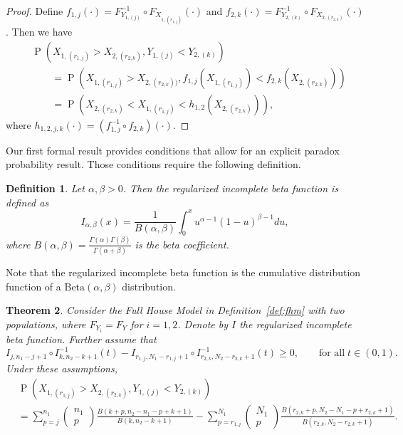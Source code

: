 \documentclass[12pt]{article}
\DeclareMathOperator*{\Prob}{P}
\newtheorem{theorem}{Theorem}[section]
\newtheorem{defn}[theorem]{Definition}
\begin{document}
\begin{proof}
Define $f_{1,j}(\cdot) = F_{Y_{1, (j)}}^{-1} \circ F_{X_{1,(r_{1,j})}} (\cdot)$ and 
$f_{2,k}(\cdot) = F_{Y_{2, (k)}}^{-1} \circ F_{X_{2,(r_{2,k})}} (\cdot)$. Then we have 
\begin{align*}
  &\Prob\left(X_{1,(r_{1,j})} > X_{2,(r_{2,k})}, Y_{1,(j)} < Y_{2,(k)}\right) \\
  &\qquad= \Prob\left(X_{1,(r_{1,j})} > X_{2,(r_{2,k}))}, f_{1,j}(X_{1,(r_{1,j})}) < f_{2,k}(X_{2,(r_{2,k})})\right) \\
  &\qquad= \Prob\left( X_{2,(r_{2,k})} < X_{1,(r_{1,j})}  < h_{1,2}\left(X_{2,(r_{2,k})}\right)\right),
\end{align*}
where $h_{1,2,j,k}(\cdot) = (f_{1,j}^{-1} \circ f_{2,k})(\cdot)$. %
\end{proof}

Our first formal result provides conditions that allow for an explicit paradox probability result. Those conditions require the following definition.

\begin{defn}
\label{def:ribf}
Let $\alpha,\beta > 0$. Then the regularized incomplete beta function is defined as
$$
  I_{\alpha,\beta}(x) = \frac{1}{B(\alpha,\beta)} \int_0^x u^{\alpha-1}(1-u)^{\beta-1}du,
$$
where $B(\alpha,\beta) = \frac{\Gamma(\alpha)\Gamma(\beta)}{\Gamma(\alpha + \beta)}$ is the beta coefficient.
\end{defn}

Note that the regularized incomplete beta function is the cumulative distribution function of a $\text{Beta}(\alpha,\beta)$ distribution. 

\begin{theorem} \label{theorem:samedistgeneral}
Consider the Full House Model in Definition~\ref{def:fhm} with two populations, where $F_{Y_i} = F_{Y}$ for $i=1,2$. Denote by $I$ the regularized incomplete beta function. Further assume that
\begin{equation} \label{eq:technical-condition}
  I_{j, n_1-j+1} \circ I_{k, n_2-k+1}^{-1} (t) - I_{r_{1,j}, N_1 - r_{1,j}+1} \circ I_{r_{2,k}, N_2 - r_{2,k} + 1}^{-1}(t) \geq 0, \qquad \text{for all} \; t \in (0,1).
\end{equation}
Under these assumptions,
\begin{align*}
	&\Prob\left(X_{1,(r_{1,j})} > X_{2,(r_{2,k})}, Y_{1,(j)} < Y_{2,(k)}\right) \\
  &= \sum_{p=j}^{n_1}\left(\begin{array}{l}
n_1 \\
p
\end{array}\right)\frac{B(k+p, n_2-n_1-p+k+1)}{B(k, n_2-k+1)} - \sum_{p=r_{1,j}}^{N_1}\left(\begin{array}{l}
N_1 \\
p
\end{array}\right)\frac{B(r_{2,k}+p, N_2-N_1-p+r_{2,k}+1)}{B(r_{2,k}, N_2-r_{2,k}+1)}.
\end{align*}
\end{theorem}
\end{document}
